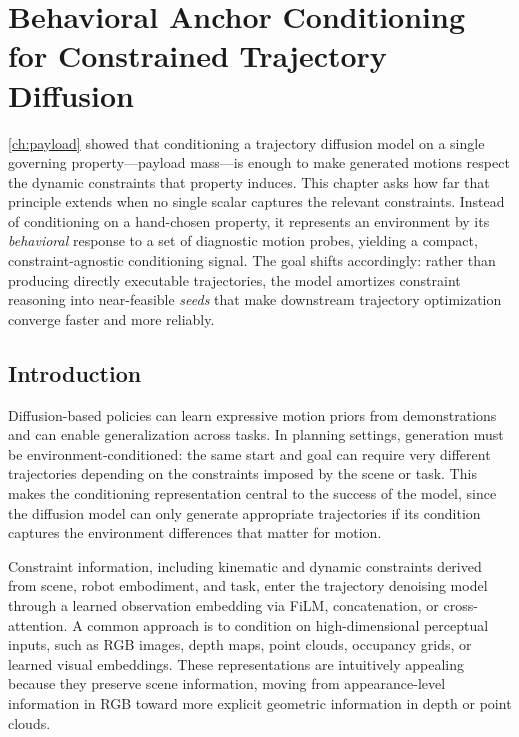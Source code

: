 
\chapter{Behavioral Anchor Conditioning for Constrained Trajectory Diffusion}
\label{ch:seeding}

\cref{ch:payload} showed that conditioning a trajectory diffusion model on a single governing property---payload mass---is enough to make generated motions respect the dynamic constraints that property induces.
This chapter asks how far that principle extends when no single scalar captures the relevant constraints.
Instead of conditioning on a hand-chosen property, it represents an environment by its \emph{behavioral} response to a set of diagnostic motion probes, yielding a compact, constraint-agnostic conditioning signal.
The goal shifts accordingly: rather than producing directly executable trajectories, the model amortizes constraint reasoning into near-feasible \emph{seeds} that make downstream trajectory optimization converge faster and more reliably.


\section{Introduction}\label{sec:introduction}

Diffusion-based policies can learn expressive motion priors from demonstrations and can enable generalization across tasks.
In planning settings, generation must be environment-conditioned: the same start and goal can require very different trajectories depending on the constraints imposed by the scene or task.
This makes the conditioning representation central to the success of the model, since the diffusion model can only generate appropriate trajectories if its condition captures the environment differences that matter for motion.

Constraint information, including kinematic and dynamic constraints derived from scene, robot embodiment, and task, enter the trajectory denoising model through a learned observation embedding via FiLM, concatenation, or cross-attention.
A common approach is to condition on high-dimensional perceptual inputs, such as RGB images, depth maps, point clouds, occupancy grids, or learned visual embeddings.
These representations are intuitively appealing because they preserve scene information, moving from appearance-level information in RGB toward more explicit geometric information in depth or point clouds.

